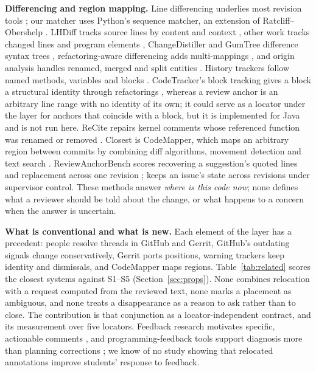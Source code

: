 \textbf{Differencing and region mapping.} Line differencing underlies most revision tools \cite{myers1986ond}; our matcher uses Python's sequence matcher, an extension of Ratcliff--Obershelp \cite{ratcliff1988pattern,pythonsequence}. LHDiff tracks source lines by content and context \cite{asaduzzaman2013lhdiff}, other work tracks changed lines and program elements \cite{canfora2007identifying,kim2006program,reiss2008tracking}, ChangeDistiller and GumTree difference syntax trees \cite{fluri2007change,falleri2014fine}, refactoring-aware differencing adds multi-mappings \cite{alikhanifard2024astdiff}, and origin analysis handles renamed, merged and split entities \cite{godfrey2005using}. History trackers follow named methods, variables and blocks \cite{grund2021codeshovel,jodavi2022codetracker,hasan2024blocktracking,islam2025historyfinder}. CodeTracker's block tracking gives a block a structural identity through refactorings \cite{hasan2024blocktracking}, whereas a review anchor is an arbitrary line range with no identity of its own; it could serve as a locator under the layer for anchors that coincide with a block, but it is implemented for Java and is not run here. ReCite repairs kernel comments whose referenced function was renamed or removed \cite{sun2026recite}. Closest is CodeMapper, which maps an arbitrary region between commits by combining diff algorithms, movement detection and text search \cite{hu2026codemapper}. ReviewAnchorBench scores recovering a suggestion's quoted lines and replacement across one revision \cite{fu2026reviewanchorbench}; \sys{} keeps an issue's state across revisions under supervisor control. These methods answer \emph{where is this code now}; none defines what a reviewer should be told about the change, or what happens to a concern when the answer is uncertain.

\textbf{What is conventional and what is new.} Each element of the layer has a precedent: people resolve threads in GitHub and Gerrit, GitHub's outdating signals change conservatively, Gerrit ports positions, warning trackers keep identity and dismissals, and CodeMapper maps regions. Table~\ref{tab:related} scores the closest systems against S1--S5 (Section~\ref{sec:props}). None combines relocation with a request computed from the reviewed text, none marks a placement as ambiguous, and none treats a disappearance as a reason to ask rather than to close. The contribution is that conjunction as a locator-independent contract, and its measurement over five locators. Feedback research motivates specific, actionable comments \cite{hattie2007power,shute2008focus}, and programming-feedback tools support diagnosis more than planning corrections \cite{keuning2018systematic}; we know of no study showing that relocated annotations improve students' response to feedback.

